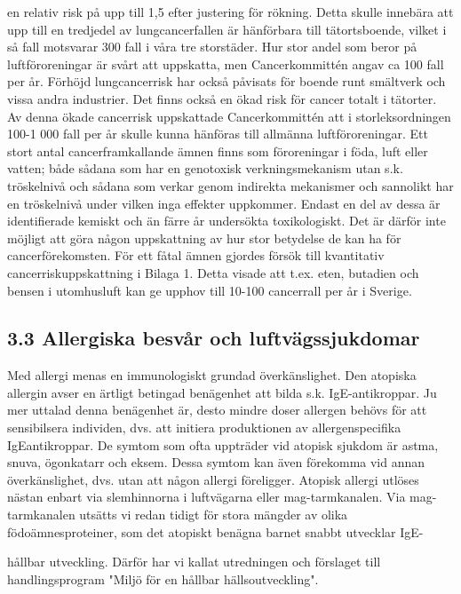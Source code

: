 en relativ risk på upp till 1,5 efter justering för rökning. Detta skulle innebära att upp till en tredjedel av lungcancerfallen är hänförbara till tätortsboende, vilket i så fall motsvarar 300 fall i våra tre storstäder. Hur stor andel som beror på luftföroreningar är svårt att uppskatta, men Cancerkommittén angav ca 100 fall per år. Förhöjd lungcancerrisk har också påvisats för boende runt smältverk och vissa andra industrier.
Det finns också en ökad risk för cancer totalt i tätorter. Av denna ökade cancerrisk uppskattade Cancerkommittén att i storleksordningen 100-1 000 fall per år skulle kunna hänföras till allmänna luftföroreningar.
Ett stort antal cancerframkallande ämnen finns som föroreningar i föda, luft eller vatten; både sådana som har en genotoxisk verkningsmekanism utan s.k. tröskelnivå och sådana som verkar genom indirekta mekanismer och sannolikt har en tröskelnivå under vilken inga effekter uppkommer. Endast en del av dessa är identifierade kemiskt och än färre år undersökta toxikologiskt. Det är därför inte möjligt att göra någon uppskattning av hur stor betydelse de kan ha för cancerförekomsten. För ett fåtal ämnen gjordes försök till kvantitativ cancerriskuppskattning i Bilaga 1. Detta visade att t.ex. eten, butadien och bensen i utomhusluft kan ge upphov till 10-100 cancerrall per år i Sverige.
\subsection*{3.3 Allergiska besvår och luftvägssjukdomar}
Med allergi menas en immunologiskt grundad överkänslighet. Den atopiska allergin avser en ärtligt betingad benägenhet att bilda s.k. IgE-antikroppar. Ju mer uttalad denna benägenhet är, desto mindre doser allergen behövs för att sensibilsera individen, dvs. att initiera produktionen av allergenspecifika IgEantikroppar. De symtom som ofta uppträder vid atopisk sjukdom är astma, snuva, ögonkatarr och eksem. Dessa symtom kan även förekomma vid annan överkänslighet, dvs. utan att någon allergi föreligger.
Atopisk allergi utlöses nästan enbart via slemhinnorna i luftvägarna eller mag-tarmkanalen. Via mag-tarmkanalen utsätts vi redan tidigt för stora mängder av olika födoämnesproteiner, som det atopiskt benägna barnet snabbt utvecklar IgE-

hållbar utveckling. Därför har vi kallat utredningen och förslaget till handlingsprogram "Miljö för en hållbar hällsoutveckling".

